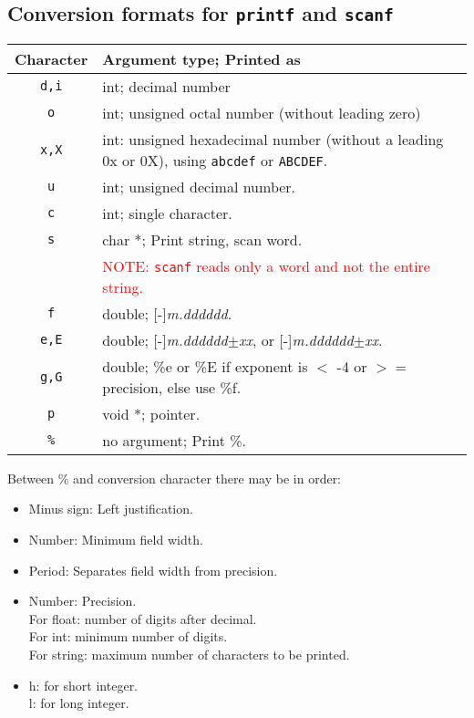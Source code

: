 \begin{multicols*}{3}
\subsection{Conversion formats for \texttt{printf} and \texttt{scanf}}
\begin{tabularx}{\linewidth}{c|X}
\hline 
\textbf{Character} & \textbf{Argument type; Printed as}\\
\hline
\texttt{d,i} & int; decimal number\\
\texttt{o} & int; unsigned octal number (without leading zero)\\
\texttt{x,X} & int: unsigned hexadecimal number (without a leading 0x or 0X), using \texttt{abcdef} or \texttt{ABCDEF}.\\
\texttt{u} & int; unsigned decimal number.\\
\texttt{c} & int; single character.\\
\texttt{s} & char *; Print string, scan word.\\
& \textcolor{red}{NOTE: \texttt{scanf} reads only a word and not the entire string.}\\
\texttt{f} & double; [-]\textit{m.dddddd}.\\
\texttt{e,E} & double; [-]\textit{m.dddddd}$\pm$\textit{xx}, or [-]\textit{m.dddddd}$\pm$\textit{xx}.\\
\texttt{g,G} & double; \%e or \%E if exponent is $<$ -4 or $>=$ precision, else use \%f.\\
\texttt{p} & void *; pointer.\\
\texttt{\%} & no argument; Print \%.\\
\hline
\end{tabularx}

Between \% and conversion character there may be in order:\\
\begin{itemize}
\item Minus sign: Left justification.
\item Number: Minimum field width.
\item Period: Separates field width from precision.
\item Number: Precision. \\
	For float: number of digits after decimal.\\
	For int: minimum number of digits.\\
	For string: maximum number of characters to be printed.\\ 
\item h: for short integer.\\
	l: for long integer.\\
\end{itemize}



\end{multicols*}
